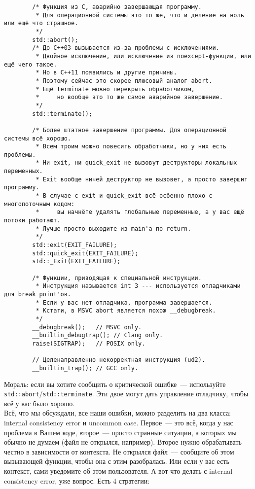\documentclass{article}
\begin{document}
    \begin{verbatim}
        /* Функция из C, аварийно завершающая программу.
         * Для операционной системы это то же, что и деление на ноль или ещё что страшное.
         */
        std::abort();
        /* До C++03 вызывается из-за проблемы с исключениями.
         * Двойное исключение, или исключение из noexcept-функции, или ещё чего такое.
         * Но в C++11 появились и другие причины.
         * Поэтому сейчас это скорее плюсовый аналог abort.
         * Ещё terminate можно перекрыть обработчиком,
         *     но вообще это то же самое аварийное завершение.
         */
        std::terminate();

        /* Более штатное завершение программы. Для операционной системы всё хорошо.
         * Всем троим можно повесить обработчики, но у них есть проблемы.
         * Ни exit, ни quick_exit не вызовут деструкторы локальных переменных.
         * Exit вообще ничей деструктор не вызовет, а просто завершит программу.
         * В случае с exit и quick_exit всё осбенно плохо с многопоточным кодом:
         *     вы начнёте удалять глобальные переменные, а у вас ещё потоки работают.
         * Лучше просто выходите из main'а по return.
         */
        std::exit(EXIT_FAILURE);
        std::quick_exit(EXIT_FAILURE);
        std::_Exit(EXIT_FAILURE);

        /* Функции, приводящая к специальной инструкции.
         * Инструкция называется int 3 --- используется отладчиками для break point'ов.
         * Если у вас нет отладчика, программа завершается.
         * Кстати, в MSVC abort является похож __debugbreak.
         */
        __debugbreak();   // MSVC only.
        __builtin_debugtrap(); // Clang only.
        raise(SIGTRAP);   // POSIX only.

        // Целенаправленно некорректная инструкция (ud2). 
        __builtin_trap(); // GCC only.
    \end{verbatim}
    Мораль: если вы хотите сообщить о критической ошибке~--- используйте \texttt{std::abort}/\texttt{std::terminate}. Эти двое могут дать управление отладчику, чтобы всё у вас было хорошо.\\
    Всё, что мы обсуждали, все наши ошибки, можно разделить на два класса: internal consistency error и uncommon case. Первое~--- это всё, когда у нас проблема в Вашем коде, второе~--- просто странные ситуации, а которых мы обычно не думаем (файл не открылся, например). Второе нужно обрабатывать честно в зависимости от контекста. Не открылся файл~--- сообщите об этом вызывающей функции, чтобы она с этим разобралась. Или если у вас есть контекст, сами уведомите об этом пользователя. А вот что делать с internal consistency error, уже вопрос. Есть 4 стратегии:
\end{document}
